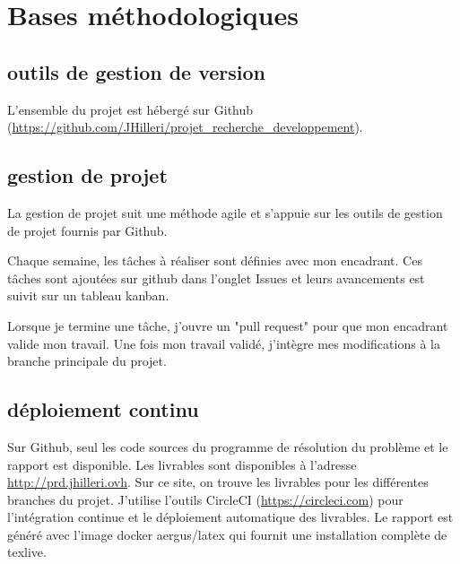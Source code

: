 \section{Bases méthodologiques}
\subsection{outils de gestion de version}
L'ensemble du projet est hébergé sur Github (\url{https://github.com/JHilleri/projet_recherche_developpement}).

\subsection{gestion de projet}
La gestion de projet suit une méthode agile et s'appuie sur les outils de gestion de projet fournis par Github.

Chaque semaine, les tâches à réaliser sont définies avec mon encadrant.
Ces tâches sont ajoutées sur github dans l'onglet Issues et leurs avancements est suivit sur un tableau kanban.

Lorsque je termine une tâche, j'ouvre un "pull request" pour que mon encadrant valide mon travail.
Une fois mon travail validé, j'intègre mes modifications à la branche principale du projet.

\subsection{déploiement continu}
Sur Github, seul les code sources du programme de résolution du problème et le rapport est disponible.
Les livrables sont disponibles à l'adresse \url{http://prd.jhilleri.ovh}.
Sur ce site, on trouve les livrables pour les différentes branches du projet.
J'utilise l'outils CircleCI (\url{https://circleci.com}) pour l'intégration continue 
    et le déploiement automatique des livrables.
Le rapport est généré avec l'image docker aergus/latex qui fournit une installation complète de texlive.
